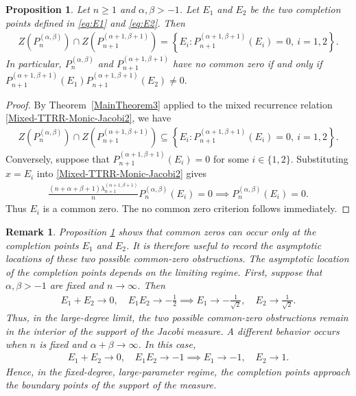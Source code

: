 \documentclass[final,3p,times,12pt]{elsarticle}
\newtheorem{proposition}{Proposition}[section]
\newtheorem{remark}{Remark}[section]
\numberwithin{equation}{section}  %
\begin{document}
	\begin{proposition}\label{ExactCommonZeroJacobiShifted}
		Let $n\geq 1$ and $\alpha,\beta>-1$. Let
		$E_{1}$ and $E_{2}$ be the two completion
		points defined in \eqref{eq:E1} and \eqref{eq:E2}. Then
		\begin{align*}
			Z(P_n^{(\alpha,\beta)})
			\cap
			Z(P_{n+1}^{(\alpha+1,\beta+1)})
			=
			\left\{
			E_{i}:
			P_{n+1}^{(\alpha+1,\beta+1)}(E_{i})=0,\ i=1,2
			\right\}.
		\end{align*}
		In particular, $P_{n}^{(\alpha,\beta)}$ and $P_{n+1}^{(\alpha+1,\beta+1)}$ have no common zero if and only if $	P_{n+1}^{(\alpha+1,\beta+1)}(E_{1})
		P_{n+1}^{(\alpha+1,\beta+1)}(E_{2})
		\neq0.$
	\end{proposition}
		\begin{proof}
		By Theorem~\ref{MainTheorem3} applied to the mixed recurrence relation
		\eqref{Mixed-TTRR-Monic-Jacobi2}, we have
		\begin{align*}
			Z(P_n^{(\alpha,\beta)})
			\cap
			Z(P_{n+1}^{(\alpha+1,\beta+1)})
			\subseteq
			\left\{
			E_{i}:
			P_{n+1}^{(\alpha+1,\beta+1)}(E_{i})=0,\ i=1,2
			\right\}.
		\end{align*}
			Conversely, suppose that  $	P_{n+1}^{(\alpha+1,\beta+1)}(E_{i})=0$ for some $i\in\{1,2\}$. 
	Substituting
		$x=E_{i}$ into \eqref{Mixed-TTRR-Monic-Jacobi2} gives
		\begin{align*}
			\frac{(n+\alpha+\beta+1)\lambda_{n+1}^{(\alpha+1,\beta+1)}}{n}
			P_n^{(\alpha,\beta)}(E_{i})
			=0 \implies 	P_n^{(\alpha,\beta)}(E_{i})=0.
		\end{align*}
		Thus $E_{i}$ is a common zero. The no common zero criterion follows immediately.
	\end{proof}
\begin{remark}
Proposition \ref{ExactCommonZeroJacobiShifted} shows that common zeros can occur only at the completion points $E_1$ and $E_2$. It is therefore useful to record the asymptotic locations of these two possible common-zero obstructions. The asymptotic location of the completion points depends on the limiting regime. First, suppose that $\alpha,\beta>-1$ are fixed and $n\to\infty$. Then
\begin{align*}
	E_1+E_2 \longrightarrow 0, \quad
	E_1E_2 \longrightarrow -\frac{1}{2} \implies E_1 \longrightarrow -\frac{1}{\sqrt{2}}, \quad
	E_2\longrightarrow \frac{1}{\sqrt{2}}.
\end{align*}
Thus, in the large-degree limit, the two possible common-zero obstructions remain in the interior of the support of the Jacobi measure. A different behavior occurs when $n$ is fixed and $\alpha+\beta\to\infty$. In this case,
\begin{align*}
	E_1+E_2 \longrightarrow 0, \quad
	E_1E_2 \longrightarrow -1 \implies E_1 \longrightarrow -1, \quad
	E_2 \longrightarrow 1.
\end{align*}
Hence, in the fixed-degree, large-parameter regime, the completion points approach the boundary points of the support of the measure.    
\end{remark}
    
\end{document}
